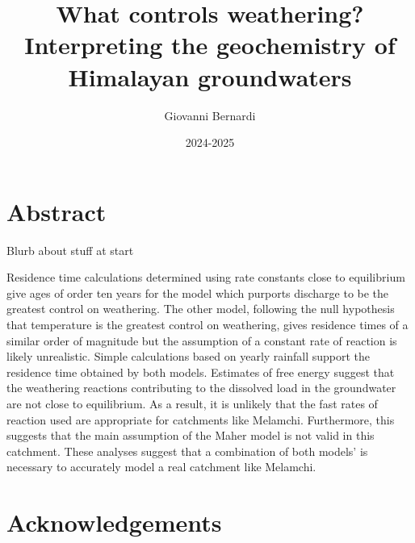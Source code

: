 \documentclass[hidelinks, 12pt]{article} %
\title{
  \vspace{-1cm}
  \textbf{What controls weathering?\\
  Interpreting the geochemistry of Himalayan groundwaters}
  \vspace{0.5cm}
}
\author{Giovanni Bernardi}
\date{2024-2025}
\newcommand{\bsk}{\vspace{\baselineskip}}
\begin{document}

\maketitle





\thispagestyle{empty}

\newpage

\section*{Abstract}
\label{sec:abstract}

Blurb about stuff at start

\bsk

Residence time calculations determined using rate constants close to equilibrium give ages of order ten years for the model which purports discharge to be the greatest control on weathering. The other model, following the null hypothesis that temperature is the greatest control on weathering, gives residence times of a similar order of magnitude but the assumption of a constant rate of reaction is likely unrealistic. Simple calculations based on yearly rainfall support the residence time obtained by both models. Estimates of free energy suggest that the weathering reactions contributing to the dissolved load in the groundwater are not close to equilibrium. As a result, it is unlikely that the fast rates of reaction used are appropriate for catchments like Melamchi. Furthermore, this suggests that the main assumption of the Maher model is not valid in this catchment. These analyses suggest that a combination of both models' is necessary to accurately model a real catchment like Melamchi.






\newpage


\thispagestyle{empty}

\tableofcontents

\newpage

\thispagestyle{empty}

\section*{Acknowledgements}
\end{document}
